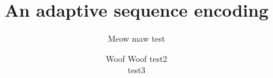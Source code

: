 \documentclass{class-for-drafts}
\title{An adaptive sequence encoding}
\author{Meow maw \aff test \and Woof Woof \aff test2 \\ test3}
\begin{document}
\maketitle

\blinddocument
\end{document}
